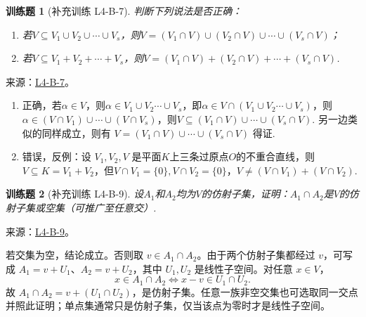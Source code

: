 \documentclass[12pt,fontset=fandol]{ctexart}
\newtheorem{exercise}{训练题}[section]
\begin{document}
\begin{exercise}[补充训练 L4-B-7]\label{prob:L4-B-7}
判断下列说法是否正确：
        \begin{enumerate}
            \item 若$V \subseteq V_1 \cup V_2 \cup \cdots \cup V_s$，则$V=(V_1 \cap V)\cup(V_2 \cap V)\cup\cdots\cup(V_s \cap V)$；

            \item 若$V \subseteq V_1+V_2+\cdots +V_s$，则$V=(V_1 \cap V)+(V_2 \cap V)+\cdots+(V_s \cap V)$.
        \end{enumerate}
\end{exercise}
\noindent 来源：\href{https://github.com/yhwu-is/Linear-Algebra-Left-Undone/blob/new/%E8%AE%B2%E4%B9%89/%E4%B8%93%E9%A2%98/4%20%E7%BA%BF%E6%80%A7%E7%A9%BA%E9%97%B4%E7%9A%84%E8%BF%90%E7%AE%97.tex}{L4-B-7}。
\begin{solve}
\begin{enumerate}
              \item 正确，若$\alpha\in V$，则$\alpha \in V_1\cup V_2\cdots \cup V_s$，即$\alpha \in V\cap (V_1\cup V_2\cdots \cup V_s)$，则$\alpha \in (V\cap V_1)\cup \cdots \cup (V\cap V_s)$，则$V\subseteq(V_1\cap V)\cup \cdots \cup (V_s\cap V)$. 另一边类似的同样成立，则有 $V=(V_1\cap V)\cup \cdots \cup (V_s\cap V)$ 得证.

              \item 错误，反例：设 $V_1,V_2,V$ 是平面$K$上三条过原点$O$的不重合直线，则$V\subseteq K=V_1+V_2$，但$V\cap V_1=\{0\},V\cap V_2=\{0\}$，$V\ne (V\cap V_1)+(V\cap V_2)$.
          \end{enumerate}
\end{solve}

\begin{exercise}[补充训练 L4-B-9]\label{prob:L4-B-9}
设$A_1$和$A_2$均为$V$的仿射子集，证明：$A_1\cap A_2$是$V$的仿射子集或空集（可推广至任意交）.
\end{exercise}
\noindent 来源：\href{https://github.com/yhwu-is/Linear-Algebra-Left-Undone/blob/new/%E8%AE%B2%E4%B9%89/%E4%B8%93%E9%A2%98/4%20%E7%BA%BF%E6%80%A7%E7%A9%BA%E9%97%B4%E7%9A%84%E8%BF%90%E7%AE%97.tex}{L4-B-9}。
\begin{solve}
若交集为空，结论成立。否则取 $v\in A_1\cap A_2$。由于两个仿射子集都经过 $v$，可写成 $A_1=v+U_1$、$A_2=v+U_2$，其中 $U_1,U_2$ 是线性子空间。对任意 $x\in V$，
\[x\in A_1\cap A_2\iff x-v\in U_1\cap U_2.\]
故 $A_1\cap A_2=v+(U_1\cap U_2)$，是仿射子集。任意一族非空交集也可选取同一交点并照此证明；单点集通常只是仿射子集，仅当该点为零时才是线性子空间。
\end{solve}
\end{document}
